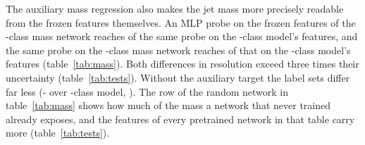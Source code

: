 The auxiliary mass regression also makes the jet mass more precisely readable from the frozen features
themselves. An MLP
probe on the frozen features of the \Kres-class mass network %
reaches \MlstCmpMlpResMassOverResPr{} of the same probe on the \Kres-class model's features, %
and the same probe on the \Kcoarse-class mass network reaches
\MlstCmpMlpCoarseMassOverCoarsePr{} of that on the \Kcoarse-class model's features (table~\ref{tab:mass}).
Both differences in resolution exceed three times their uncertainty (table~\ref{tab:tests}). Without the
auxiliary target the label sets differ far less (\Kcoarse- over \Kfull-class model, \MlstCmpMlpCoarseOverFullPr). %
The row of the random network in
table~\ref{tab:mass} shows how much of the mass a network that never trained already exposes, and %
the features of every pretrained network in that table carry more (table~\ref{tab:tests}).



